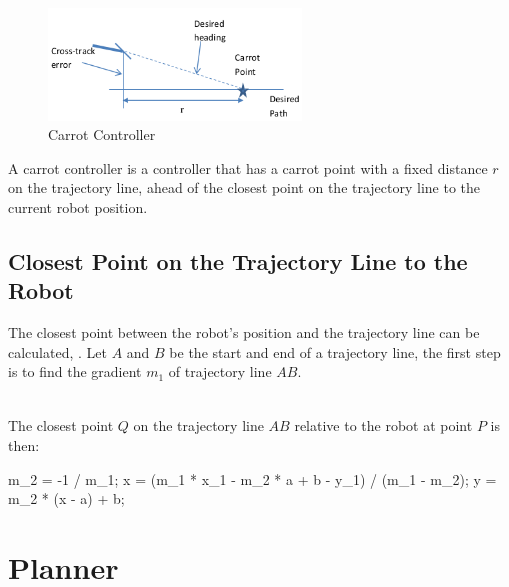 \documentclass{article}
\begin{document}
\begin{figure}[H]
	\centering
	\includegraphics[width=0.6\textwidth]{images/carrot_controller.png}
	\caption{Carrot Controller}
	\label{fig:carrot_controller}
\end{figure}

A carrot controller is a controller that has a carrot point with a fixed distance $r$ on the trajectory line, ahead of the closest point on the trajectory line to the current robot position.


\subsection{Closest Point on the Trajectory Line to the Robot}
The closest point between the robot's position and the trajectory line can be calculated, . Let $A$ and $B$ be the start and end of a trajectory line, the first step is to find the gradient $m_{1}$ of trajectory line $AB$.


\begin{align}

	
	
\end{align}


The closest point $Q$ on the trajectory line $AB$ relative to the robot at point $P$ is then:

m_{2} = -1 / m_{1};
x = (m_{1} * x_{1} - m_{2} * a + b - y_{1}) / (m_{1} - m_{2});
y = m_{2} * (x - a) + b;

\newpage
\section{Planner}
\end{document}
